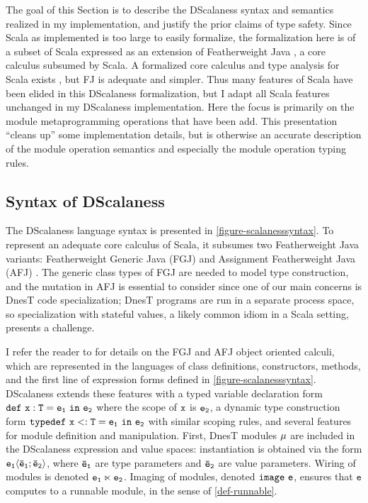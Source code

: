 The goal of this Section is to describe the DScalaness syntax and semantics realized in my
implementation, and justify the prior claims of type safety. Since Scala as implemented is too
large to easily formalize, the formalization here is of a subset of Scala expressed as an
extension of Featherweight Java \cite{FJ}, a core calculus subsumed by Scala. A formalized core
calculus and type analysis for Scala exists \cite{Cremet:2006:CCS:2135978.2135980}, but FJ is
adequate and simpler. Thus many features of Scala have been elided in this DScalaness
formalization, but I adapt all Scala features unchanged in my DScalaness implementation. Here the
focus is primarily on the module metaprogramming operations that have been add. This
presentation ``cleans up'' some implementation details, but is otherwise an accurate description
of the module operation semantics and especially the module operation typing rules.

\subsection{Syntax of DScalaness}

\scalanesssyntaxfig

The DScalaness language syntax is presented in \autoref{figure-scalanesssyntax}. To represent an
adequate core calculus of Scala, it subsumes two Featherweight Java variants: Featherweight
Generic Java (FGJ) \cite{FJ} and Assignment Featherweight Java (AFJ) \cite{AFJ}. The generic
class types of FGJ are needed to model type construction, and the mutation in AFJ is essential
to consider since one of our main concerns is DnesT code specialization; DnesT programs are run
in a separate process space, so specialization with stateful values, a likely common idiom in a
Scala setting, presents a challenge.

I refer the reader to \cite{FJ,AFJ} for details on the FGJ and AFJ object oriented calculi,
which are represented in the languages of class definitions, constructors, methods, and the
first line of expression forms defined in \autoref{figure-scalanesssyntax}. DScalaness extends
these features with a typed variable declaration form $\jdef{x}{T}{e_1}{e_2}$ where the scope of
$\tt{x}$ is $\tt{e_2}$, a dynamic type construction form $\jtlet{x}{T}{e_1}{e_2}$ with similar
scoping rules, and several features for module definition and manipulation. First, DnesT modules
$\jmodval$ are included in the DScalaness expression and value spaces: instantiation is obtained
via the form $\jinst{e_1}{\ttvec{e}_1; \ttvec{e}_2}$, where $\ttvec{e}_\texttt{1}$ are type
parameters and $\ttvec{e}_\texttt{2}$ are value parameters. Wiring of modules is denoted
$\jwire{\tt{e_1}}{\tt{e_2}}$. Imaging of modules, denoted $\jimage{\texttt{e}}$, ensures that
$\texttt{e}$ computes to a runnable module, in the sense of \autoref{def-runnable}.

